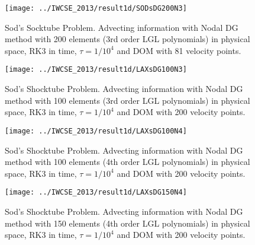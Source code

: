 \begin{frame}
		\begin{figure}
			\centering
				\texttt{[image: ../IWCSE\_2013/result1d/SODsDG200N3]}
			\caption{Sod's  Socktube Problem. Advecting information with Nodal DG method with 200 elements (3rd order LGL polynomials) in physical space, RK3 in time, $\tau = 1/10^4$ and DOM with 81 velocity points.}
			\label{fig:SODsDG200N3}
		\end{figure}
\end{frame}

\begin{frame}
		\begin{figure}
			\centering
				\texttt{[image: ../IWCSE\_2013/result1d/LAXsDG100N3]}
			\caption{Sod's Shocktube Problem. Advecting information with Nodal DG method with 100 elements (3rd order LGL polynomials) in physical space, RK3 in time, $\tau = 1/10^4$ and DOM with 200 velocity points.}
			\label{fig:LAXsDG100N3}
		\end{figure}
\end{frame}

\begin{frame}
		\begin{figure}
			\centering
				\texttt{[image: ../IWCSE\_2013/result1d/LAXsDG100N4]}
			\caption{Sod's Shocktube Problem. Advecting information with Nodal DG method with 100 elements (4th order LGL polynomials) in physical space, RK3 in time, $\tau = 1/10^4$ and DOM with 200 velocity points.}
			\label{fig:LAXsDG100N4}
		\end{figure}
\end{frame}

\begin{frame}
		\begin{figure}
			\centering
				\texttt{[image: ../IWCSE\_2013/result1d/LAXsDG150N4]}
			\caption{Sod's Shocktube Problem. Advecting information with Nodal DG method with 150 elements (4th order LGL polynomials) in physical space, RK3 in time, $\tau = 1/10^4$ and DOM with 200 velocity points.}
			\label{fig:LAXsDG150N4}
		\end{figure}
\end{frame}

